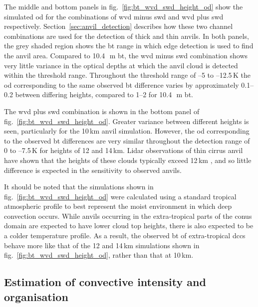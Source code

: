 The middle and bottom panels in fig.~\ref{fig:bt_wvd_swd_height_od} show the simulated \acrshort{od} for the combinations of \acrshort{wvd} minus \acrshort{swd} and \acrshort{wvd} plus \acrshort{swd} respectively.
Section~\ref{sec:anvil_detection} describes how these two channel combinations are used for the detection of thick and thin anvils.
In both panels, the grey shaded region shows the \acrshort{bt} range in which edge detection is used to find the anvil area.
Compared to 10.4\,\unit{\mu m} \acrshort{bt}, the \acrshort{wvd} minus \acrshort{swd} combination shows very little variance in the optical depths at which the anvil cloud is detected within the threshold range.
Throughout the threshold range of --5 to --12.5\,\unit{K} the \acrshort{od} corresponding to the same observed \acrshort{bt} difference varies by approximately 0.1--0.2 between differing heights, compared to 1--2 for 10.4\,\unit{\mu m} \acrshort{bt}.

The \acrshort{wvd} plus \acrshort{swd} combination is shown in the bottom panel of fig.~\ref{fig:bt_wvd_swd_height_od}.
Greater variance between different heights is seen, particularly for the 10\,\unit{km} anvil simulation.
However, the \acrshort{od} corresponding to the observed \acrshort{bt} differences are very similar throughout the detection range of 0 to --7.5\,\unit{K} for heights of 12 and 14\,\unit{km}.
Lidar observations of thin cirrus anvil have shown that the heights of these clouds typically exceed 12\,\unit{km} \citep{wall_observational_2020, horner_evolution_2023}, and so little difference is expected in the sensitivity to observed anvils.

It should be noted that the simulations shown in fig.~\ref{fig:bt_wvd_swd_height_od} were calculated using a standard tropical atmospheric profile to best represent the moist environment in which deep convection occurs.
While anvils occurring in the extra-tropical parts of the \acrshort{conus} domain are expected to have lower cloud top heights, there is also expected to be a colder temperature profile.
As a result, the observed \acrshort{bt} of extra-tropical \acrshort{dcc}s behave more like that of the 12 and 14\,\unit{km} simulations shown in fig.~\ref{fig:bt_wvd_swd_height_od}, rather than that at 10\,\unit{km}.


\subsection{Estimation of convective intensity and organisation} \label{sec:method_proxies}

